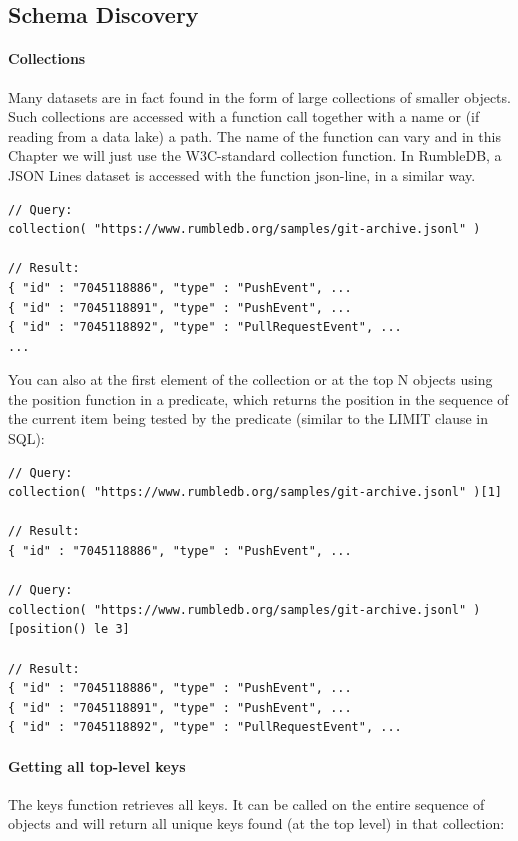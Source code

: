 \subsection{Schema Discovery}

\paragraph{Collections}
Many datasets are in fact found in the form of large collections of smaller objects. Such collections are accessed with a function call together with a name or (if reading from a data lake) a path. The name of the function can vary and in this Chapter we will just use the W3C-standard collection function. In RumbleDB, a JSON Lines dataset is accessed with the function json-line, in a similar way.

\begin{lstlisting}[style=json]
// Query:
collection( "https://www.rumbledb.org/samples/git-archive.jsonl" )

// Result:
{ "id" : "7045118886", "type" : "PushEvent", ...
{ "id" : "7045118891", "type" : "PushEvent", ...
{ "id" : "7045118892", "type" : "PullRequestEvent", ...
...
\end{lstlisting}

You can also at the first element of the collection or at the top N objects using the position function in a predicate, which returns the position in the sequence of the current item being tested by the predicate (similar to the LIMIT clause in SQL):

\begin{lstlisting}[style=json]
// Query:
collection( "https://www.rumbledb.org/samples/git-archive.jsonl" )[1]

// Result:
{ "id" : "7045118886", "type" : "PushEvent", ...

// Query:
collection( "https://www.rumbledb.org/samples/git-archive.jsonl" )[position() le 3]

// Result:
{ "id" : "7045118886", "type" : "PushEvent", ...
{ "id" : "7045118891", "type" : "PushEvent", ...
{ "id" : "7045118892", "type" : "PullRequestEvent", ...
\end{lstlisting}

\paragraph{Getting all top-level keys}
The keys function retrieves all keys. It can be called on the entire sequence of objects and will return all unique keys found (at the top level) in that collection:

